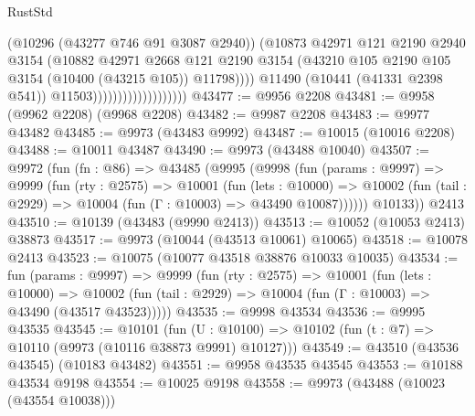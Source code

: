 \begin{lexlean}{RustStd}
\begin{coremodule}
                                            (@10296 (@43277 @746 @91 @3087 @2940))
                                            (@10873
                                              @42971
                                              @121
                                              @2190
                                              @2940
                                              @3154
                                              (@10882
                                                @42971
                                                @2668
                                                @121
                                                @2190
                                                @3154
                                                (@43210
                                                  @105
                                                  @2190
                                                  @105
                                                  @3154
                                                  (@10400 (@43215 @105))
                                                  @11798))))
                                          @11490
                                          (@10441 (@41331 @2398 @541))
                                          @11503)))))))))))))))))))
@43477 := @9956 @2208
@43481 := @9958 (@9962 @2208) (@9968 @2208)
@43482 := @9987 @2208
@43483 := @9977 @43482
@43485 := @9973 (@43483 @9992)
@43487 := @10015 (@10016 @2208)
@43488 := @10011 @43487
@43490 := @9973 (@43488 @10040)
@43507 := @9972
    (fun (fn : @86) =>
    @43485
      (@9995
        (@9998
          (fun (params : @9997) =>
          @9999
            (fun (rty : @2575) =>
            @10001
              (fun (lets : @10000) =>
              @10002 (fun (tail : @2929) => @10004 (fun (Γ : @10003) => @43490 @10087))))))
        @10133))
    @2413
@43510 := @10139 (@43483 (@9990 @2413))
@43513 := @10052 (@10053 @2413) @38873
@43517 := @9973 (@10044 (@43513 @10061) @10065)
@43518 := @10078 @2413
@43523 := @10075 (@10077 @43518 @38876 @10033 @10035)
@43534 := fun (params : @9997) =>
  @9999
    (fun (rty : @2575) =>
    @10001
      (fun (lets : @10000) =>
      @10002 (fun (tail : @2929) => @10004 (fun (Γ : @10003) => @43490 (@43517 @43523)))))
@43535 := @9998 @43534
@43536 := @9995 @43535
@43545 := @10101
    (fun (U : @10100) => @10102 (fun (t : @7) => @10110 (@9973 (@10116 @38873 @9991) @10127)))
@43549 := @43510 (@43536 @43545) (@10183 @43482)
@43551 := @9958 @43535 @43545
@43553 := @10188 @43534 @9198
@43554 := @10025 @9198
@43558 := @9973 (@43488 (@10023 (@43554 @10038)))

\end{coremodule}
\end{lexlean}
